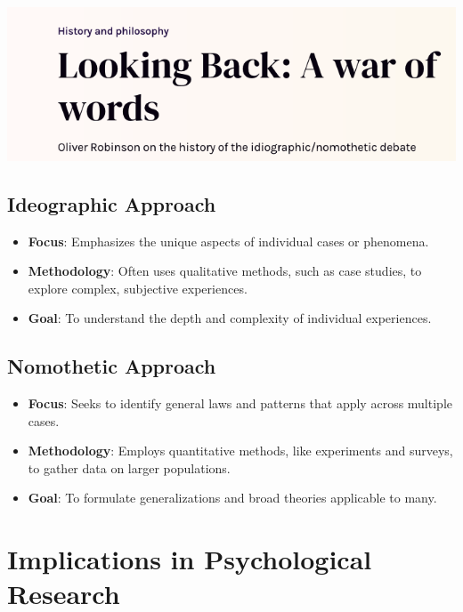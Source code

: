 \documentclass[
  letterpaper,
  DIV=11,
  numbers=noendperiod]{scrartcl}
\providecommand{\tightlist}{%
  \setlength{\itemsep}{0pt}\setlength{\parskip}{0pt}}\usepackage{longtable,booktabs,array}
\begin{document}
\href{https://www.bps.org.uk/psychologist/looking-back-war-words}{\includegraphics{images/Qual@2x.png}}

\subsection{Ideographic Approach}\label{ideographic-approach}

\begin{itemize}
\tightlist
\item
  \textbf{Focus}: Emphasizes the unique aspects of individual cases or
  phenomena.
\item
  \textbf{Methodology}: Often uses qualitative methods, such as case
  studies, to explore complex, subjective experiences.
\item
  \textbf{Goal}: To understand the depth and complexity of individual
  experiences.
\end{itemize}

\subsection{Nomothetic Approach}\label{nomothetic-approach}

\begin{itemize}
\tightlist
\item
  \textbf{Focus}: Seeks to identify general laws and patterns that apply
  across multiple cases.
\item
  \textbf{Methodology}: Employs quantitative methods, like experiments
  and surveys, to gather data on larger populations.
\item
  \textbf{Goal}: To formulate generalizations and broad theories
  applicable to many.
\end{itemize}

\section{Implications in Psychological
Research}\label{implications-in-psychological-research}
\end{document}
